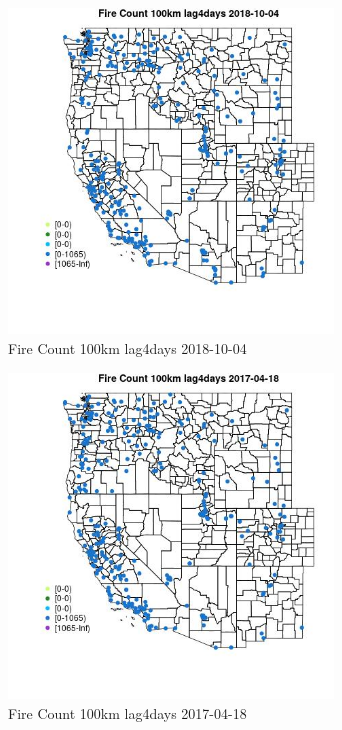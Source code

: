 \begin{figure} 
\centering  
\includegraphics[width=0.77\textwidth]{Code_Outputs/Report_ML_input_PM25_Step4_part_f_de_duplicated_aveswNAs_MapObsFire_Count_100km_lag4days2018-10-04.jpg} 
\caption{\label{fig:Report_ML_input_PM25_Step4_part_f_de_duplicated_aveswNAsMapObsFire_Count_100km_lag4days2018-10-04}Fire Count 100km lag4days 2018-10-04} 
\end{figure} 
 

\clearpage 

\begin{figure} 
\centering  
\includegraphics[width=0.77\textwidth]{Code_Outputs/Report_ML_input_PM25_Step4_part_f_de_duplicated_aveswNAs_MapObsFire_Count_100km_lag4days2017-04-18.jpg} 
\caption{\label{fig:Report_ML_input_PM25_Step4_part_f_de_duplicated_aveswNAsMapObsFire_Count_100km_lag4days2017-04-18}Fire Count 100km lag4days 2017-04-18} 
\end{figure} 
 


